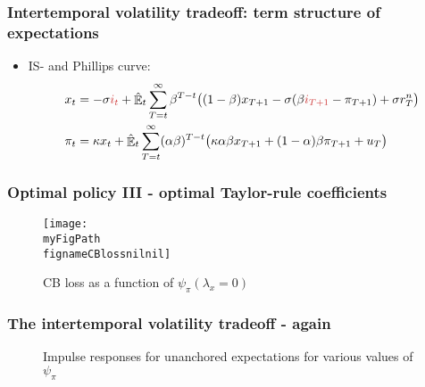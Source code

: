 \documentclass[10pt]{beamer}
\def \myFigPath {../../../figures/}
\DeclareMathOperator{\E}{\mathbb{E}}
\def\fignameCBlossnilnil{plot_sim_loss_approx_pretty_losses_again_critsmooth_constant_only_pi_only_lamx0_lami0_2020_08_27}
\def\fignameIRFpsipiSmall{command_IFS_anchoring_pretty_RIR_LH_unanch_monpol_again_critCUSUM_constant_only_T_400_N_1000_burnin_5_params_psi_pi_1_01_psi_x_0_gbar_0_145_thetbar_16_thettilde_2_5_kap_0_8_lamx_0_lami_0_date_2020_06_05}
\def\fignameIRFpsipiMedium{command_IFS_anchoring_pretty_RIR_LH_unanch_monpol_again_critCUSUM_constant_only_T_400_N_1000_burnin_5_params_psi_pi_1_5_psi_x_0_gbar_0_145_thetbar_16_thettilde_2_5_kap_0_8_lamx_0_lami_0_date_2020_06_05}
\def\fignameIRFpsipiBig{command_IFS_anchoring_pretty_RIR_LH_unanch_monpol_again_critCUSUM_constant_only_T_400_N_1000_burnin_5_params_psi_pi_2_psi_x_0_gbar_0_145_thetbar_16_thettilde_2_5_kap_0_8_lamx_0_lami_0_date_2020_06_05}
\begin{document}
\begin{frame}
	\frametitle{Intertemporal volatility tradeoff: term structure of expectations}
\begin{itemize}
\item[] IS- and Phillips curve:	
 \begin{align*}
x_t &=  -\sigma \textcolor{brownreddark}{i_t} +\hat{\E}_t \sum_{T=t}^{\infty} \beta^{T-t }\big( (1-\beta)x_{T+1} - \sigma(\beta \textcolor{brownreddark}{i_{T+1}} - \pi_{T+1}) +\sigma r_T^n \big)   \\
\pi_t &= \kappa x_t +\hat{\E}_t \sum_{T=t}^{\infty} (\alpha\beta)^{T-t }\big( \kappa \alpha \beta x_{T+1} + (1-\alpha)\beta \pi_{T+1} + u_T\big) 
\end{align*}


\end{itemize}



\end{frame}


\begin{frame}
	\frametitle{Optimal policy III - optimal Taylor-rule coefficients}
	
\begin{figure}[h!]
\texttt{[image: \\myFigPath \\fignameCBlossnilnil]}
\caption{CB loss as a function of $\psi_{\pi} (\lambda_x = 0)$}
\end{figure} 

\end{frame}

\begin{frame}
	\frametitle{The intertemporal volatility tradeoff - again}

\begin{figure}[h!]
\caption{Impulse responses for unanchored expectations for various values of $\psi_{\pi}$}
\label{IRF_unanchored_psi}
\end{figure}

\end{frame}
\end{document}
